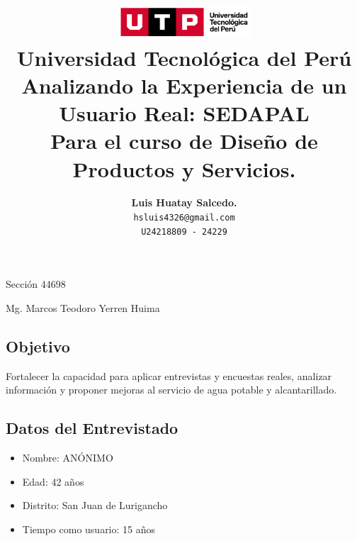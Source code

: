 \documentclass{article}
\title{
  \includegraphics[width=5cm]{./assets/logo-utp.png} \\
  \vspace{1cm}
  \textbf{Universidad Tecnológica del Perú} \\
  \vspace{2cm}
  \textbf{Analizando la Experiencia de un Usuario Real: SEDAPAL} \\
  \vspace{1cm}
  \large \textbf{Para el curso de Diseño de Productos y Servicios.}
}
\author{
  \textbf{Luis Huatay Salcedo.} \\
  \texttt{hsluis4326@gmail.com} \\
  \texttt{U24218809 - 24229}
}
\begin{document}
\maketitle
\begin{center}
  Sección 44698
\end{center}
\thispagestyle{empty}
\begin{center}
  Mg. Marcos Teodoro Yerren Huima  
\end{center}
\restoregeometry




\newpage

\subsection*{Objetivo}
Fortalecer la capacidad para aplicar entrevistas y encuestas reales, analizar información y proponer mejoras al servicio de agua potable y alcantarillado.

\subsection*{Datos del Entrevistado}
\begin{itemize}
    \item Nombre: ANÓNIMO
    \item Edad: 42 años
    \item Distrito: San Juan de Lurigancho
    \item Tiempo como usuario: 15 años
\end{itemize}
\end{document}
